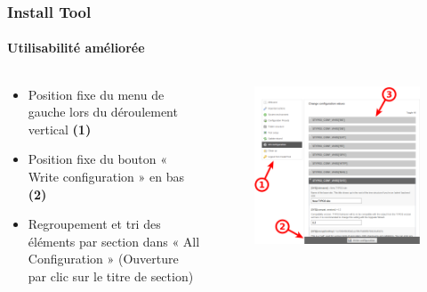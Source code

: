 
\begin{frame}[fragile]
	\frametitle{Install Tool}
	\framesubtitle{Utilisabilité améliorée}

	\begin{columns}[T]
		\begin{column}{.5\textwidth}

			\begin{itemize}
				\item Position fixe du menu de gauche lors du déroulement vertical
					\begingroup\color{typo3red}\textbf{(1)}\endgroup
				\item Position fixe du bouton « Write configuration » en bas
					\begingroup\color{typo3red}\textbf{(2)}\endgroup
				\item Regroupement et tri des éléments par section dans « All Configuration » (Ouverture par clic sur le titre de section)
			\end{itemize}

		\end{column}
		\begin{column}{.5\textwidth}

			\begin{figure}\vspace*{-0.4cm}
				\includegraphics[width=0.8\linewidth]{Images/InstallTool/ImprovedUsability.png}
			\end{figure}

		\end{column}
	\end{columns}

\end{frame}


